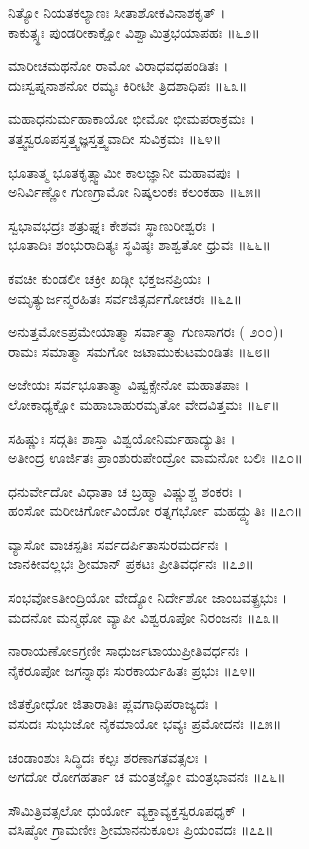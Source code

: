 ನಿತ್ಯೋ ನಿಯತಕಲ್ಯಾಣಃ ಸೀತಾಶೋಕವಿನಾಶಕೃತ್ ।\\
ಕಾಕುತ್ಸ್ಥಃ ಪುಂಡರೀಕಾಕ್ಷೋ ವಿಶ್ವಾಮಿತ್ರಭಯಾಪಹಃ ॥೬೨॥

ಮಾರೀಚಮಥನೋ ರಾಮೋ ವಿರಾಧವಧಪಂಡಿತಃ ।\\
ದುಃಸ್ವಪ್ನನಾಶನೋ ರಮ್ಯಃ ಕಿರೀಟೀ ತ್ರಿದಶಾಧಿಪಃ ॥೬೩॥

ಮಹಾಧನುರ್ಮಹಾಕಾಯೋ ಭೀಮೋ ಭೀಮಪರಾಕ್ರಮಃ ।\\
ತತ್ತ್ವಸ್ವರೂಪಸ್ತತ್ತ್ವಜ್ಞಸ್ತತ್ತ್ವವಾದೀ ಸುವಿಕ್ರಮಃ ॥೬೪॥

ಭೂತಾತ್ಮ ಭೂತಕೃತ್ಸ್ವಾಮೀ ಕಾಲಜ್ಞಾನೀ ಮಹಾವಪುಃ ।\\
ಅನಿರ್ವಿಣ್ಣೋ ಗುಣಗ್ರಾಮೋ ನಿಷ್ಕಲಂಕಃ ಕಲಂಕಹಾ ॥೬೫॥

ಸ್ವಭಾವಭದ್ರಃ ಶತ್ರುಘ್ನಃ ಕೇಶವಃ ಸ್ಥಾಣುರೀಶ್ವರಃ ।\\
ಭೂತಾದಿಃ ಶಂಭುರಾದಿತ್ಯಃ ಸ್ಥವಿಷ್ಠಃ ಶಾಶ್ವತೋ ಧ್ರುವಃ ॥೬೬॥

ಕವಚೀ ಕುಂಡಲೀ ಚಕ್ರೀ ಖಡ್ಗೀ ಭಕ್ತಜನಪ್ರಿಯಃ ।\\
ಅಮೃತ್ಯುರ್ಜನ್ಮರಹಿತಃ ಸರ್ವಜಿತ್ಸರ್ವಗೋಚರಃ ॥೬೭॥

ಅನುತ್ತಮೋಽಪ್ರಮೇಯಾತ್ಮಾ ಸರ್ವಾತ್ಮಾ ಗುಣಸಾಗರಃ ( ೨೦೦)।\\
ರಾಮಃ ಸಮಾತ್ಮಾ ಸಮಗೋ ಜಟಾಮುಕುಟಮಂಡಿತಃ ॥೬೮॥

ಅಜೇಯಃ ಸರ್ವಭೂತಾತ್ಮಾ ವಿಷ್ವಕ್ಸೇನೋ ಮಹಾತಪಾಃ ।\\
ಲೋಕಾಧ್ಯಕ್ಷೋ ಮಹಾಬಾಹುರಮೃತೋ ವೇದವಿತ್ತಮಃ ॥೬೯॥

ಸಹಿಷ್ಣುಃ ಸದ್ಗತಿಃ ಶಾಸ್ತಾ ವಿಶ್ವಯೋನಿರ್ಮಹಾದ್ಯುತಿಃ ।\\
ಅತೀಂದ್ರ ಊರ್ಜಿತಃ ಪ್ರಾಂಶುರುಪೇಂದ್ರೋ ವಾಮನೋ ಬಲಿಃ ॥೭೦॥

ಧನುರ್ವೇದೋ ವಿಧಾತಾ ಚ ಬ್ರಹ್ಮಾ ವಿಷ್ಣುಶ್ಚ ಶಂಕರಃ ।\\
ಹಂಸೋ ಮರೀಚಿರ್ಗೋವಿಂದೋ ರತ್ನಗರ್ಭೋ ಮಹದ್ದ್ಯುತಿಃ ॥೭೧॥

ವ್ಯಾಸೋ ವಾಚಸ್ಪತಿಃ ಸರ್ವದರ್ಪಿತಾಸುರಮರ್ದನಃ ।\\
ಜಾನಕೀವಲ್ಲಭಃ ಶ್ರೀಮಾನ್ ಪ್ರಕಟಃ ಪ್ರೀತಿವರ್ಧನಃ ॥೭೨॥

ಸಂಭವೋಽತೀಂದ್ರಿಯೋ ವೇದ್ಯೋ ನಿರ್ದೇಶೋ ಜಾಂಬವತ್ಪ್ರಭುಃ ।\\
ಮದನೋ ಮನ್ಮಥೋ ವ್ಯಾಪೀ ವಿಶ್ವರೂಪೋ ನಿರಂಜನಃ ॥೭೩॥

ನಾರಾಯಣೋಽಗ್ರಣೀ ಸಾಧುರ್ಜಟಾಯುಪ್ರೀತಿವರ್ಧನಃ ।\\
ನೈಕರೂಪೋ ಜಗನ್ನಾಥಃ ಸುರಕಾರ್ಯಹಿತಃ ಪ್ರಭುಃ ॥೭೪॥

ಜಿತಕ್ರೋಧೋ ಜಿತಾರಾತಿಃ ಪ್ಲವಗಾಧಿಪರಾಜ್ಯದಃ ।\\
ವಸುದಃ ಸುಭುಜೋ ನೈಕಮಾಯೋ ಭವ್ಯಃ ಪ್ರಮೋದನಃ ॥೭೫॥

ಚಂಡಾಂಶುಃ ಸಿದ್ಧಿದಃ ಕಲ್ಪಃ ಶರಣಾಗತವತ್ಸಲಃ ।\\
ಅಗದೋ ರೋಗಹರ್ತಾ ಚ ಮಂತ್ರಜ್ಞೋ ಮಂತ್ರಭಾವನಃ ॥೭೬॥

ಸೌಮಿತ್ರಿವತ್ಸಲೋ ಧುರ್ಯೋ ವ್ಯಕ್ತಾವ್ಯಕ್ತಸ್ವರೂಪಧೃಕ್ ।\\
ವಸಿಷ್ಠೋ ಗ್ರಾಮಣೀಃ ಶ್ರೀಮಾನನುಕೂಲಃ ಪ್ರಿಯಂವದಃ ॥೭೭॥

